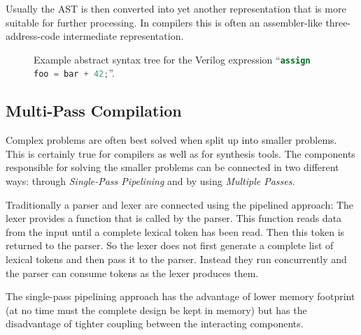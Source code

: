Usually the AST is then converted into yet another representation that is more suitable for further processing.
In compilers this is often an assembler-like three-address-code intermediate representation. \cite{Dragonbook}

\begin{figure}[t]
	\hfil
	\caption{Example abstract syntax tree for the Verilog expression ``\lstinline[language=Verilog]{assign foo = bar + 42;}''.}
	\label{fig:Basics_ast}
\end{figure}

\subsection{Multi-Pass Compilation}

Complex problems are often best solved when split up into smaller problems. This is certainly true
for compilers as well as for synthesis tools. The components responsible for solving the smaller problems can
be connected in two different ways: through {\it Single-Pass Pipelining} and by using {\it Multiple Passes}.

Traditionally a parser and lexer are connected using the pipelined approach: The lexer provides a function that
is called by the parser. This function reads data from the input until a complete lexical token has been read. Then
this token is returned to the parser. So the lexer does not first generate a complete list of lexical tokens
and then pass it to the parser. Instead they run concurrently and the parser can consume tokens as
the lexer produces them.

The single-pass pipelining approach has the advantage of lower memory footprint (at no time must the complete design
be kept in memory) but has the disadvantage of tighter coupling between the interacting components.


